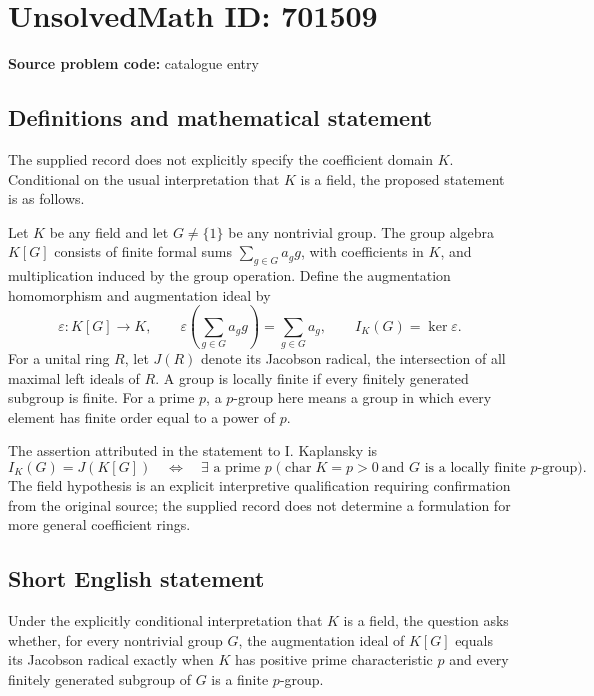 \documentclass[11pt]{article}
\begin{document}
\section*{UnsolvedMath ID: 701509}
\textbf{Source problem code:} catalogue entry
\subsection{Definitions and mathematical statement}
The supplied record does not explicitly specify the coefficient domain \(K\). Conditional on the usual interpretation that \(K\) is a field, the proposed statement is as follows.

Let \(K\) be any field and let \(G\neq\{1\}\) be any nontrivial group. The group algebra \(K[G]\) consists of finite formal sums \(\sum_{g\in G}a_g g\), with coefficients in \(K\), and multiplication induced by the group operation. Define the augmentation homomorphism and augmentation ideal by
\[
\varepsilon:K[G]\longrightarrow K,\qquad
\varepsilon\!\left(\sum_{g\in G}a_g g\right)=\sum_{g\in G}a_g,
\qquad I_K(G)=\ker\varepsilon.
\]
For a unital ring \(R\), let \(J(R)\) denote its Jacobson radical, the intersection of all maximal left ideals of \(R\). A group is locally finite if every finitely generated subgroup is finite. For a prime \(p\), a \(p\)-group here means a group in which every element has finite order equal to a power of \(p\).

The assertion attributed in the statement to I. Kaplansky is
\[
I_K(G)=J(K[G])
\quad\Longleftrightarrow\quad
\exists\text{ a prime }p\;\bigl(\operatorname{char}K=p>0
\ \text{and }G\text{ is a locally finite }p\text{-group}\bigr).
\]
The field hypothesis is an explicit interpretive qualification requiring confirmation from the original source; the supplied record does not determine a formulation for more general coefficient rings.
\subsection{Short English statement}
Under the explicitly conditional interpretation that \(K\) is a field, the question asks whether, for every nontrivial group \(G\), the augmentation ideal of \(K[G]\) equals its Jacobson radical exactly when \(K\) has positive prime characteristic \(p\) and every finitely generated subgroup of \(G\) is a finite \(p\)-group.
\end{document}
